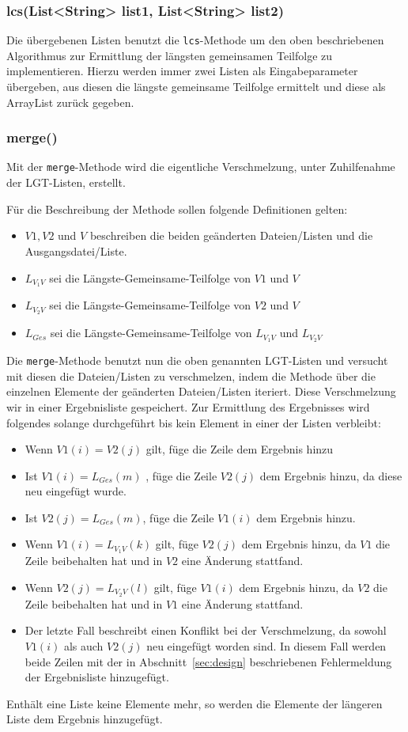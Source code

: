 \documentclass[a4paper,titlepage,12pt]{scrartcl}
\begin{document}
\subsubsection{lcs(List<String> list1, List<String> list2)}
\label{sec:lcs}
Die übergebenen Listen benutzt die \texttt{lcs}-Methode um den oben beschriebenen Algorithmus zur Ermittlung der längsten gemeinsamen Teilfolge zu implementieren.
Hierzu werden immer zwei Listen als Eingabeparameter übergeben, aus diesen die längste gemeinsame Teilfolge ermittelt und diese als ArrayList zurück gegeben.

\subsubsection{merge()}
\label{sec:merge}
Mit der \texttt{merge}-Methode wird die eigentliche Verschmelzung, unter Zuhilfenahme der LGT-Listen, erstellt.

Für die Beschreibung der Methode sollen folgende Definitionen gelten:
\begin{itemize}
\item $V1 , V2$ und $V$ beschreiben die beiden geänderten Dateien/Listen und die Ausgangsdatei/Liste.
\item $L_{V_{1}V}$ sei die Längste-Gemeinsame-Teilfolge von $V1$ und $V$
\item $L_{V_{2}V}$ sei die Längste-Gemeinsame-Teilfolge von $V2$ und $V$
\item $L_{Ges}$ sei die Längste-Gemeinsame-Teilfolge von $L_{V_{1}V}$ und $L_{V_{2}V}$
\end{itemize}

Die \texttt{merge}-Methode benutzt nun die oben genannten LGT-Listen und versucht mit diesen die Dateien/Listen zu verschmelzen,
indem die Methode über die einzelnen Elemente der geänderten Dateien/Listen iteriert. Diese Verschmelzung wir in einer Ergebnisliste gespeichert.
Zur Ermittlung des Ergebnisses wird folgendes solange durchgeführt bis kein Element in einer der Listen verbleibt:
\begin{itemize}
\item Wenn $V1(i) = V2(j)$ gilt, füge die Zeile dem Ergebnis hinzu
\item Ist $V1(i) = L_{Ges}(m)$ , füge die Zeile $V2(j)$ dem Ergebnis hinzu, da diese neu eingefügt wurde.
\item Ist $V2(j) = L_{Ges}(m)$, füge die Zeile $V1(i)$ dem Ergebnis hinzu.
\item Wenn $V1(i) = L_{V_{1}V}(k)$ gilt, füge $V2(j)$ dem Ergebnis hinzu, da $V1$ die Zeile beibehalten hat und in $V2$ eine Änderung stattfand.
\item Wenn $V2(j) = L_{V_{2}V}(l)$ gilt, füge $V1(i)$ dem Ergebnis hinzu, da $V2$ die Zeile beibehalten hat und in $V1$ eine Änderung stattfand.
\item Der letzte Fall beschreibt einen Konflikt bei der Verschmelzung, da sowohl $V1(i)$ als auch $V2(j)$ neu eingefügt worden sind. In diesem Fall werden beide Zeilen mit der in Abschnitt~\ref{sec:design} beschriebenen Fehlermeldung der Ergebnisliste hinzugefügt.
\end{itemize}
Enthält eine Liste keine Elemente mehr, so werden die Elemente der längeren Liste dem Ergebnis hinzugefügt.
\end{document}
